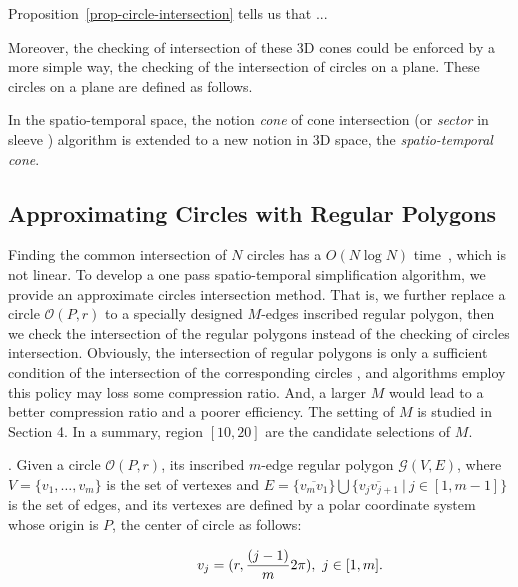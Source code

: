 Proposition~\ref{prop-circle-intersection} tells us that ...


Moreover, the checking of intersection of these 3D cones could be enforced by a more simple way, \ie the checking of the intersection of circles on a plane. These circles on a plane are defined as follows.



In the spatio-temporal space, the notion \emph{cone} of cone intersection \cite{Williams:Longest, Sklansky:Cone} (or \emph{sector} in sleeve \cite{Zhao:Sleeve}) algorithm is extended to a new notion in 3D space, \ie the \emph{spatio-temporal cone}.

\subsection{Approximating Circles with Regular Polygons}
Finding the common intersection of $N$ circles has a ${O(N\log N)}$ time~\cite{Shamos:Circle}, which is not linear.
To develop a one pass spatio-temporal simplification algorithm, we provide an approximate circles intersection method.
That is, we further replace a circle $\mathcal{O}(P, r)$ to a specially designed $M$-edges inscribed regular polygon,
then we check the intersection of the regular polygons instead of the checking of circles intersection.
Obviously, the intersection of regular polygons is only a sufficient condition of the intersection of the corresponding circles , and
algorithms employ this policy may loss some compression ratio.
And, a larger $M$ would lead to a better compression ratio and a poorer efficiency.
\textcolor[rgb]{0.00,0.07,1.00}{The setting of $M$ is studied in Section 4. In a summary, region $[10, 20]$ are the candidate selections of $M$.}

.
Given a circle $\mathcal{O}(P, r)$, its inscribed $m$-edge regular polygon $\mathcal{G}(V, E)$,
where $V=\{v_1, \ldots, v_{m}\}$ is the set of vertexes and
$E= \{\overline{v_mv_1}\} \bigcup \{\overline{v_jv_{j+1}}\ |\ j\in [1, m-1]\}$ is the set of edges,
and its vertexes are defined by a polar coordinate system whose  origin is $P$, the center of circle \circle{} as follows:


\vspace{-2ex}
\begin{equation*}
\label{equ-regular-polygon}
    \begin{aligned}
        \hspace{10ex}  v_j = (r, \frac{(j-1)}{m}2\pi), ~j \in [1, m].\\
    \end{aligned}
\end{equation*}
\vspace{-1ex}

